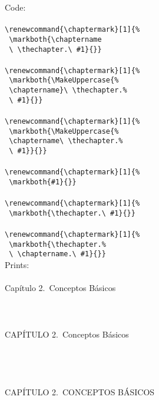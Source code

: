 \begin{figure}
\setlength{\columnsep}{20pt}\small
\begin{multicols}{2}
\noindent Code:\\
\mbox{}\\
\verb|\renewcommand{\chaptermark}[1]{%|\\
\verb| \markboth{\chaptername|\\
\verb| \ \thechapter.\ #1}{}}|\\
\mbox{}\\
\verb|\renewcommand{\chaptermark}[1]{%|\\
\verb| \markboth{\MakeUppercase{%|\\
\verb| \chaptername}\ \thechapter.%|\\
\verb| \ #1}{}}|\\
\mbox{}\\
\verb|\renewcommand{\chaptermark}[1]{%|\\
\verb| \markboth{\MakeUppercase{%|\\
\verb| \chaptername\ \thechapter.%|\\
\verb| \ #1}}{}}|\\
\mbox{}\\
\verb|\renewcommand{\chaptermark}[1]{%|\\
\verb| \markboth{#1}{}}|\\
\mbox{}\\
\verb|\renewcommand{\chaptermark}[1]{%|\\
\verb| \markboth{\thechapter.\ #1}{}}|\\
\mbox{}\\
\verb|\renewcommand{\chaptermark}[1]{%|\\
\verb| \markboth{\thechapter.%|\\
\verb| \ \chaptername.\ #1}{}}|\\
Prints:\\
\mbox{}\\
Capítulo 2.\ Conceptos Básicos\\
\mbox{}\\
\mbox{}\\
\mbox{}\\
CAPÍTULO 2.\ Conceptos Básicos\\
\mbox{}\\
\mbox{}\\
\mbox{}\\
\mbox{}\\
CAPÍTULO 2.\ CONCEPTOS BÁSICOS\\
\mbox{}\\

\end{multicols}
\end{figure}
